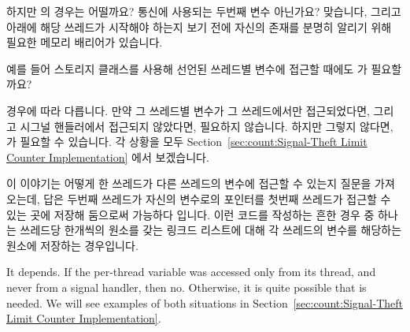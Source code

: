 \begin{enumerate}
	하지만  의 경우는 어떨까요?
	통신에 사용되는 두번째 변수 아닌가요?
	맞습니다, 그리고  아래에 해당 쓰레드가
	시작해야 하는지 보기 전에 자신의 존재를 분명히 알리기 위해 필요한
	메모리 배리어가 있습니다.

\QuickQ{}
	예를 들어   스토리지 클래스를 사용해 선언된
	쓰레드별 변수에 접근할 때에도  가 필요할까요?

\QuickA{}
	경우에 따라 다릅니다.
	만약 그 쓰레드별 변수가 그 쓰레드에서만 접근되었다면, 그리고 시그널
	핸들러에서 접근되지 않았다면, 필요하지 않습니다.
	하지만 그렇지 않다면,  가 필요할 수 있습니다.
	각 상황을 모두 Section~\ref{sec:count:Signal-Theft Limit Counter
	Implementation} 에서 보겠습니다.

	이 이야기는 어떻게 한 쓰레드가 다른 쓰레드의  변수에
	접근할 수 있는지 질문을 가져오는데, 답은 두번째 쓰레드가 자신의
	 변수로의 포인터를 첫번째 쓰레드가 접근할 수 있는 곳에
	저장해 둠으로써 가능하다 입니다.
	이런 코드를 작성하는 흔한 경우 중 하나는 쓰레드당 한개씩의 원소를 갖는
	링크드 리스트에 대해 각 쓰레드의  변수를 해당하는 원소에
	저장하는 경우입니다.

	\iffalse
	It depends.
	If the per-thread variable was accessed only from its thread,
	and never from a signal handler, then no.
	Otherwise, it is quite possible that  is needed.
	We will see examples of both situations in
	Section~\ref{sec:count:Signal-Theft Limit Counter Implementation}.


\end{enumerate}

